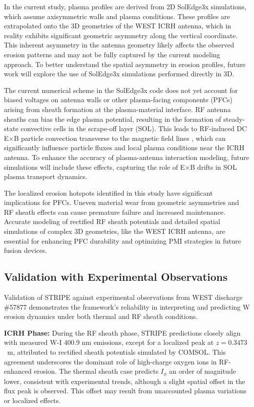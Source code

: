 \documentclass[10pt]{iopart}
\begin{document}
In the current study, plasma profiles are derived from 2D SolEdge3x simulations, which assume axisymmetric walls and plasma conditions. These profiles are extrapolated onto the 3D geometries of the WEST ICRH antenna, which in reality exhibits significant geometric asymmetry along the vertical coordinate. This inherent asymmetry in the antenna geometry likely affects the observed erosion patterns and may not be fully captured by the current modeling approach. To better understand the spatial asymmetry in erosion profiles, future work will explore the use of SolEdge3x simulations performed directly in 3D. 

The current numerical scheme in the SolEdge3x code does not yet account for biased voltages on antenna walls or other plasma-facing components (PFCs) arising from sheath formation at the plasma-material interface. RF antenna sheaths can bias the edge plasma potential, resulting in the formation of steady-state convective cells in the scrape-off layer (SOL). This leads to RF-induced DC E×B particle convection transverse to the magnetic field lines \cite{Ippolito:1993, Kubic:2012, Tamain:2017}, which can significantly influence particle fluxes and local plasma conditions near the ICRH  antenna. To enhance the accuracy of plasma-antenna interaction modeling, future simulations will include these effects, capturing the role of E×B drifts in SOL plasma transport dynamics.

The localized erosion hotspots identified in this study have significant implications for PFCs. Uneven material wear from geometric asymmetries and RF sheath effects can cause premature failure and increased maintenance. Accurate modeling of rectified RF sheath potentials and detailed spatial simulations of complex 3D geometries, like the WEST ICRH antenna, are essential for enhancing PFC durability and optimizing PMI strategies in future fusion devices.

\subsection{Validation with Experimental Observations}
\label{subssec:73}
Validation of STRIPE against experimental observations from WEST discharge \#57877 demonstrates the framework's reliability in interpreting and predicting W erosion dynamics under both thermal and RF sheath conditions.

\textbf{ICRH Phase:} During the RF sheath phase, STRIPE predictions closely align with measured W-I 400.9 nm emissions, except for a localized peak at \(z=0.3473\)~m, attributed to rectified sheath potentials simulated by COMSOL. This agreement underscores the dominant role of high-charge oxygen ions  in RF-enhanced erosion. The thermal sheath case predicts $I_\phi$ an order of magnitude lower, consistent with experimental trends, although a slight spatial offset in the flux peak is observed. This offset may result from unaccounted plasma variations or localized effects.
\end{document}
